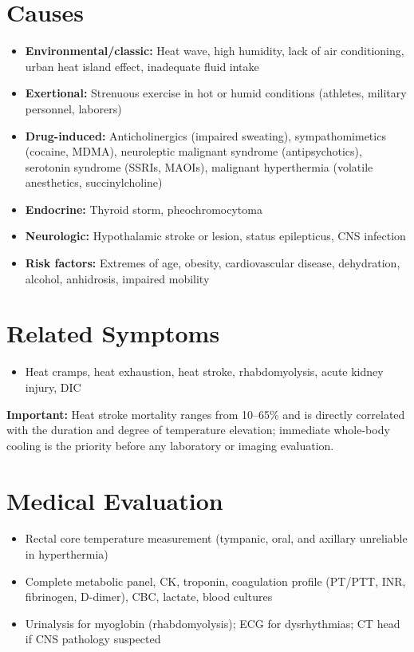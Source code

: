 \section*{Causes}
\begin{itemize}
  \item \textbf{Environmental/classic:} Heat wave, high humidity, lack of air conditioning, urban heat island effect, inadequate fluid intake
  \item \textbf{Exertional:} Strenuous exercise in hot or humid conditions (athletes, military personnel, laborers)
  \item \textbf{Drug-induced:} Anticholinergics (impaired sweating), sympathomimetics (cocaine, MDMA), neuroleptic malignant syndrome (antipsychotics), serotonin syndrome (SSRIs, MAOIs), malignant hyperthermia (volatile anesthetics, succinylcholine)
  \item \textbf{Endocrine:} Thyroid storm, pheochromocytoma
  \item \textbf{Neurologic:} Hypothalamic stroke or lesion, status epilepticus, CNS infection
  \item \textbf{Risk factors:} Extremes of age, obesity, cardiovascular disease, dehydration, alcohol, anhidrosis, impaired mobility
\end{itemize}

\section*{Related Symptoms}
\begin{itemize}
  \item Heat cramps, heat exhaustion, heat stroke, rhabdomyolysis, acute kidney injury, DIC
\end{itemize}
\textbf{Important:} Heat stroke mortality ranges from 10--65\% and is directly correlated with the duration and degree of temperature elevation; immediate whole-body cooling is the priority before any laboratory or imaging evaluation.

\section*{Medical Evaluation}
\begin{itemize}
  \item Rectal core temperature measurement (tympanic, oral, and axillary unreliable in hyperthermia)
  \item Complete metabolic panel, CK, troponin, coagulation profile (PT/PTT, INR, fibrinogen, D-dimer), CBC, lactate, blood cultures
  \item Urinalysis for myoglobin (rhabdomyolysis); ECG for dysrhythmias; CT head if CNS pathology suspected
\end{itemize}


